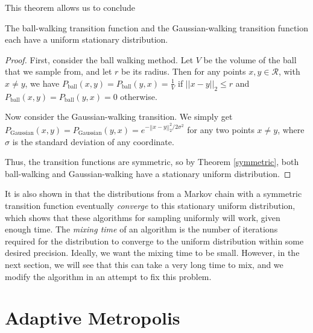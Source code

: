 \documentclass[11pt]{article}
\begin{document}
This theorem allows us to conclude
\begin{proposition}
The ball-walking transition function and the Gaussian-walking transition function each have a uniform stationary distribution.
\end{proposition}
\begin{proof}
First, consider the ball walking method. Let $V$ be the volume of the ball that we sample from, and let $r$ be its radius. Then for any points $x,y\in\mathcal{R}$, with $x\ne y$, we have $P_\text{ball}(x,y) = P_\text{ball}(y,x) = \frac{1}{V}$ if $||x-y||_2 \le r$ and $P_\text{ball}(x,y) = P_\text{ball}(y,x) = 0$ otherwise.

Now consider the Gaussian-walking transition. We simply get $P_\text{Gaussian}(x,y) = P_\text{Gaussian}(y,x) = e^{-||x-y||_2^2 / 2\sigma^2}$ for any two points $x\ne y$, where $\sigma$ is the standard deviation of any coordinate.

Thus, the transition functions are symmetric, so by Theorem \ref{symmetric}, both ball-walking and Gaussian-walking have a stationary uniform distribution.
\end{proof}

It is also shown in \cite{Smith} that the distributions from a Markov chain with a symmetric transition function eventually \emph{converge} to this stationary uniform distribution, which shows that these algorithms for sampling uniformly will work, given enough time. The \emph{mixing time} of an algorithm is the number of iterations required for the distribution to converge to the uniform distribution within some desired precision. Ideally, we want the mixing time to be small. However, in the next section, we will see that this can take a very long time to mix, and we modify the algorithm in an attempt to fix this problem.


\section{Adaptive Metropolis}
\end{document}
